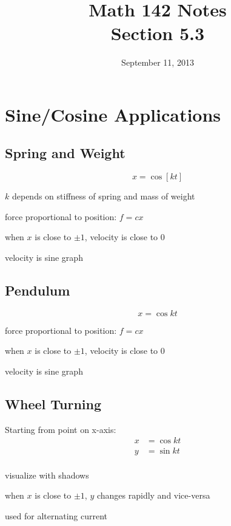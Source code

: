 \documentclass{exam}
\title{Math 142 Notes \\ Section 5.3}
\date{September 11, 2013}
\begin{document}
  \maketitle
  \tableofcontents

  \section{Sine/Cosine Applications}

  \subsection{Spring and Weight}
  \[
    x = \cos \left[ k t \right]
  \]
  \begin{itemize*}
    \item $k$ depends on stiffness of spring and mass of weight
    \item force proportional to position: $f = cx$
    \item when $x$ is close to $\pm 1$, velocity is close to $0$
    \item velocity is sine graph
  \end{itemize*}

  \subsection{Pendulum}
  \[
    x = \cos kt 
  \]
  \begin{itemize*}
    \item force proportional to position: $f = cx$
    \item when $x$ is close to $\pm 1$, velocity is close to $0$
    \item velocity is sine graph
  \end{itemize*}

  \subsection{Wheel Turning}
  Starting from point on x-axis:
  \begin{align*}
    x &= \cos kt \\
    y &= \sin kt \\
  \end{align*}

  \begin{itemize*}
    \item visualize with shadows
    \item when $x$ is close to $\pm 1$, $y$ changes rapidly and vice-versa
    \item used for alternating current
  \end{itemize*}
\end{document}
